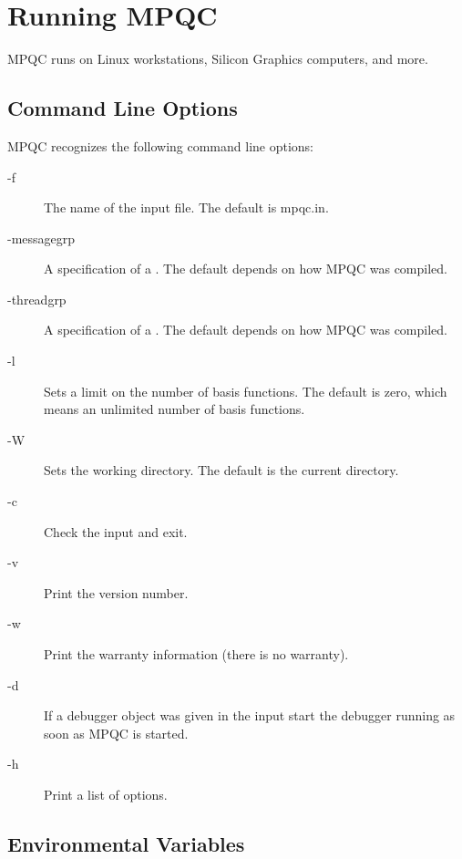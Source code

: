 
\chapter{Running MPQC}
\label{running mpqc}

MPQC runs on Linux workstations, Silicon Graphics computers,
and more.

\section{Command Line Options}

  MPQC recognizes the following command line options:

\begin{description}
\item[{\ttfamily -f}] The name of the input file.  The default is
                     {\ttfamily mpqc.in}.
\item[{\ttfamily -messagegrp}] A  specification of a
                       .
                      The default depends on how MPQC was compiled.
\item[{\ttfamily -threadgrp}] A  specification of a
                       .
                      The default depends on how MPQC was compiled.
\item[{\ttfamily -l}] Sets a limit on the number of basis functions.
                     The default is zero, which means an unlimited number
                     of basis functions.
\item[{\ttfamily -W}] Sets the working directory.  The default is the
                      current directory.
\item[{\ttfamily -c}] Check the input and exit.
\item[{\ttfamily -v}] Print the version number.
\item[{\ttfamily -w}] Print the warranty information (there is no
                      warranty).
\item[{\ttfamily -d}] If a debugger object was given in the input
                      start the debugger running as soon as MPQC
                      is started.
\item[{\ttfamily -h}] Print a list of options.
\end{description}

\section{Environmental Variables}

